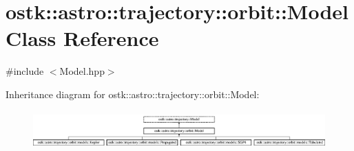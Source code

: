 \hypertarget{classostk_1_1astro_1_1trajectory_1_1orbit_1_1_model}{}\section{ostk\+:\+:astro\+:\+:trajectory\+:\+:orbit\+:\+:Model Class Reference}
\label{classostk_1_1astro_1_1trajectory_1_1orbit_1_1_model}


{\ttfamily \#include $<$Model.\+hpp$>$}

Inheritance diagram for ostk\+:\+:astro\+:\+:trajectory\+:\+:orbit\+:\+:Model\+:\begin{figure}[H]
\begin{center}
\leavevmode
\includegraphics[height=1.484099cm]{classostk_1_1astro_1_1trajectory_1_1orbit_1_1_model}
\end{center}
\end{figure}
